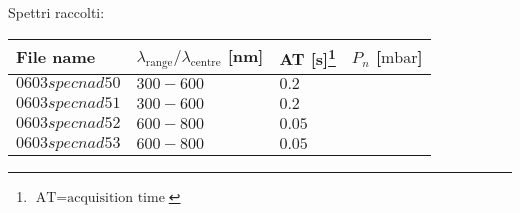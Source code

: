 Spettri raccolti:
\begin{center}
\begin{tabular}{p{3cm}p{4cm}p{2cm}p{3cm}}
\toprule
File name	&$\lambda_\text{range}\text{/}\lambda_\text{centre}$ [nm] 	&AT [s]\footnote{$\text{AT}=\text{acquisition time}$} &$P_n$ [$\si{\milli\bar}$]\\
\midrule
$0603specnad50$	&$300-600$	&$0.2$		&$  $\\
$0603specnad51$	&$300-600$	&$0.2$		&$  $\\
$0603specnad52$	&$600-800$	&$0.05$		&$  $\\
$0603specnad53$	&$600-800$	&$0.05$		&$  $\\

\bottomrule
\end{tabular}
\end{center}
